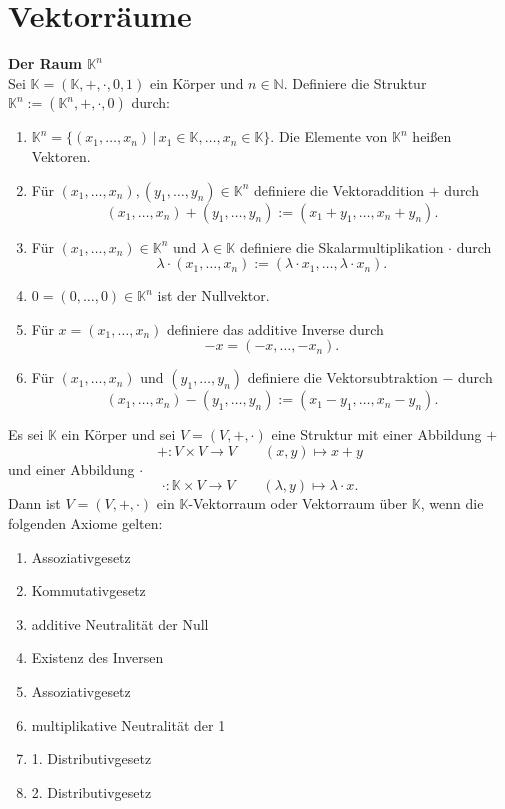 \documentclass[a4paper,12pt]{article}
\begin{document}
\section{Vektorräume}
\textbf{Der Raum $\mathbb{K}^{n}$}\\
Sei $\mathbb{K}=\left(\mathbb{K},+,\cdot ,0,1\right)$ ein Körper und $n  \in \mathbb{N}$. Definiere die Struktur $\mathbb{K}^{n}:=\left(\mathbb{K}^{n},+,\cdot ,0\right)$ durch:
\begin{enumerate}[label=(\alph*)]
        \item $\mathbb{K}^{n}=\{\left(x_1,\hdots ,x_n\right)\,|\, x_1 \in \mathbb{K},\hdots ,x_ n  \in \mathbb{K}\}$. Die Elemente von $\mathbb{K}^{n}$ heißen Vektoren.
        \item Für $\left(x_1,\hdots ,x_n\right),\left(y_1,\hdots ,y_n\right) \in \mathbb{K}^{n}$ definiere die Vektoraddition $+$ durch
                \[ 
                        \left(x_1,\hdots ,x_n\right)+\left(y_1,\hdots ,y_n\right):=\left(x_1+y_1,\hdots ,x_n+y_n\right)
                .\] 
        \item Für $\left(x_1,\hdots ,x_n\right) \in \mathbb{K}^{n}$ und $\lambda  \in \mathbb{K}$ definiere die Skalarmultiplikation $\cdot $ durch
                \[ 
                        \lambda \cdot \left(x_1,\hdots ,x_n\right):=\left(\lambda \cdot x_1,\hdots ,\lambda \cdot x_n\right)
                .\] 
        \item $0=\left(0,\hdots ,0\right) \in \mathbb{K}^{n}$ ist der Nullvektor.
        \item Für $x=\left(x_1,\hdots ,x_n\right)$ definiere das additive Inverse durch
                \[ 
                        -x=\left(-x,\hdots ,-x_n\right)
                .\] 
        \item Für $\left(x_1,\hdots ,x_n\right)$ und $\left(y_1,\hdots ,y_n\right)$ definiere die Vektorsubtraktion $-$ durch
                \[ 
                        \left(x_1,\hdots ,x_n\right)-\left(y_1,\hdots ,y_n\right):=\left(x_1-y_1,\hdots ,x_n-y_n\right)
                .\] 
\end{enumerate}
Es sei $\mathbb{K}$ ein Körper und sei $V=\left(V,+,\cdot \right)$ eine Struktur mit einer Abbildung $+$ 
\[ 
        +:V\times V\rightarrow V\qquad \left(x,y\right)\mapsto x+y
\] 
und einer Abbildung $\cdot $ 
\[ 
        \cdot :\mathbb{K}\times V\rightarrow V\qquad \left(\lambda ,y\right)\mapsto\lambda \cdot x
.\] 
Dann ist $V=\left(V,+,\cdot \right)$ ein $\mathbb{K}$-Vektorraum oder Vektorraum über $\mathbb{K}$, wenn die folgenden Axiome gelten:
\begin{enumerate}[label=(\alph*)]
        \item Assoziativgesetz
        \item Kommutativgesetz
        \item additive Neutralität der Null 
        \item Existenz des Inversen
        \item Assoziativgesetz
        \item multiplikative Neutralität der 1
        \item 1. Distributivgesetz
        \item 2. Distributivgesetz
\end{enumerate}
\end{document}
